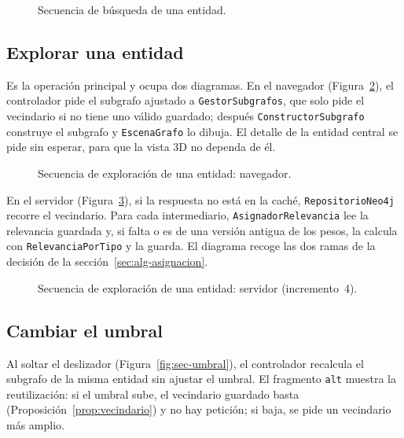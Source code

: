 \begin{figure}[htbp]
  \centering
  \caption{Secuencia de búsqueda de una entidad.}
  \label{fig:sec-buscar}
\end{figure}

\subsection{Explorar una entidad}

Es la operación principal y ocupa dos diagramas. En el navegador (Figura~\ref{fig:sec-explorar-cliente}), el controlador pide el subgrafo ajustado a \texttt{GestorSubgrafos}, que solo pide el vecindario si no tiene uno válido guardado; después \texttt{ConstructorSubgrafo} construye el subgrafo y \texttt{EscenaGrafo} lo dibuja. El detalle de la entidad central se pide sin esperar, para que la vista 3D no dependa de él.

\begin{figure}[htbp]
  \centering
  \caption{Secuencia de exploración de una entidad: navegador.}
  \label{fig:sec-explorar-cliente}
\end{figure}

En el servidor (Figura~\ref{fig:sec-explorar-servidor}), si la respuesta no está en la caché, \texttt{RepositorioNeo4j} recorre el vecindario. Para cada intermediario, \texttt{AsignadorRelevancia} lee la relevancia guardada y, si falta o es de una versión antigua de los pesos, la calcula con \texttt{RelevanciaPorTipo} y la guarda. El diagrama recoge las dos ramas de la decisión de la sección~\ref{sec:alg-asignacion}.

\begin{figure}[htbp]
  \centering
  \caption{Secuencia de exploración de una entidad: servidor (incremento~4).}
  \label{fig:sec-explorar-servidor}
\end{figure}

\subsection{Cambiar el umbral}

Al soltar el deslizador (Figura~\ref{fig:sec-umbral}), el controlador recalcula el subgrafo de la misma entidad sin ajustar el umbral. El fragmento \texttt{alt} muestra la reutilización: si el umbral sube, el vecindario guardado basta (Proposición~\ref{prop:vecindario}) y no hay petición; si baja, se pide un vecindario más amplio.


